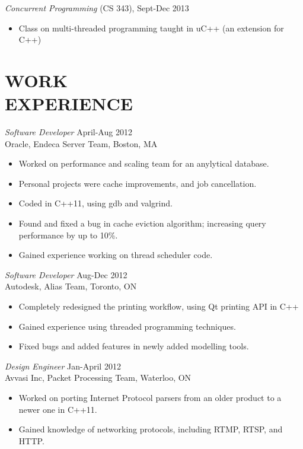 \documentclass[line,margin]{res}
\begin{document}
\begin{resume}
        {\sl Concurrent Programming} (CS 343), \hfill Sept-Dec 2013 \\
        \begin{itemize}
        \item Class on multi-threaded programming taught in uC++ (an extension for C++)
        \end{itemize}

\section{WORK \\ EXPERIENCE}
        {\sl Software Developer} \hfill April-Aug 2012 \\
        Oracle, Endeca Server Team, Boston, MA \\
        \begin{itemize}
        \item Worked on performance and scaling team for an anylytical database.
        \item Personal projects were cache improvements, and job cancellation.
        \item Coded in C++11, using gdb and valgrind.
        \item Found and fixed a bug in cache eviction algorithm; increasing query performance by up to 10\%.
        \item Gained experience working on thread scheduler code.
        \end{itemize}

        {\sl Software Developer} \hfill Aug-Dec 2012 \\
        Autodesk, Alias Team, Toronto, ON \\
        \begin{itemize}
        \item Completely redesigned the printing workflow, using Qt printing API in C++
        \item Gained experience using threaded programming techniques.
        \item Fixed bugs and added features in newly added modelling tools.
        \end{itemize}

        {\sl Design Engineer} \hfill Jan-April 2012 \\
        Avvasi Inc, Packet Processing Team, Waterloo, ON \\
        \begin{itemize}
        \item Worked on porting Internet Protocol parsers from an older product to a newer one in C++11.
        \item Gained knowledge of networking protocols, including RTMP, RTSP, and HTTP.
        \end{itemize}
\end{resume}
\end{document}
